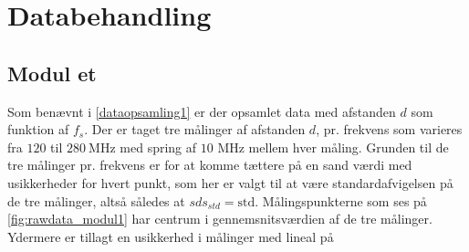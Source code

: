 \documentclass[main]{subfiles}
\begin{document}
\section{Databehandling}
\subsection{Modul et}

Som benævnt i \cref{dataopsamling1} er der opsamlet data med afstanden $d$ som funktion af $f_s$. Der er taget tre målinger af afstanden $d$, pr. frekvens som varieres fra $120$ til $280 \ \si{\mega\hertz}$ med spring af $10$ $\si{\mega\hertz}$ mellem hver måling. Grunden til de tre målinger pr. frekvens er for at komme tættere på en sand værdi med usikkerheder for hvert punkt, som her er valgt til at være standardafvigelsen på de tre målinger, altså således at $sds_{std} = \text{std}$. Målingspunkterne som ses på \cref{fig:rawdata_modul1} har centrum i gennemsnitsværdien af de tre målinger. Ydermere er tillagt en usikkerhed i målinger med lineal på
\end{document}
